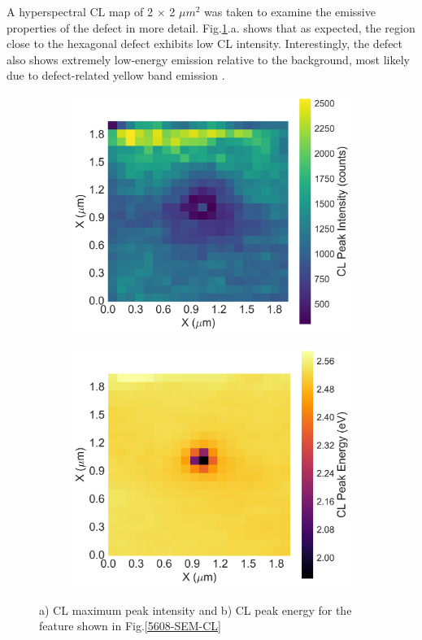 A hyperspectral CL map of 2 $\times$ 2 $\mu m^{2}$ was taken to examine the emissive properties of the defect in more detail. Fig.\ref{11-CL}.a. shows that as expected, the region close to the hexagonal defect exhibits low CL intensity. Interestingly, the defect also shows extremely low-energy emission relative to the background, most likely due to defect-related yellow band emission \cite{Lyons2010}.

\begin{figure}[h]
	
	\begin{subfigure}[b]{0.48\textwidth}
		\centering
		\includegraphics[width=1\linewidth]{Figs/Ch3/11-peak}
		\caption{}
		
	\end{subfigure}%
	\hspace*{0.5cm}
	\begin{subfigure}[b]{0.48\textwidth}
		\centering
		\includegraphics[width=1\linewidth]{Figs/Ch3/11-centre}
		\caption{}
	\end{subfigure}%
	
	\caption{a) CL maximum peak intensity and b) CL peak energy for the feature shown in Fig.\ref{5608-SEM-CL}}
	\label{11-CL}
\end{figure}
